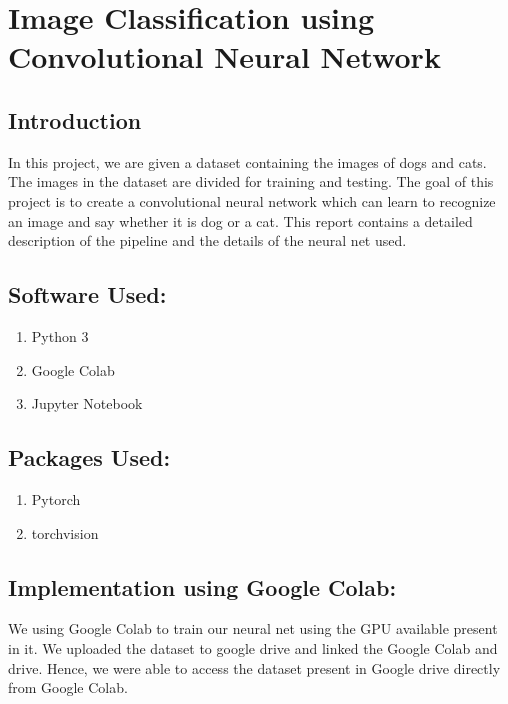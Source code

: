 \documentclass[12pt]{article}
\begin{document}
\section{Image Classification using Convolutional Neural Network} 
\subsection{Introduction}
In this project, we are given a dataset containing the images of dogs and cats. The images in the dataset are divided for training and testing. The goal of this project is to create a convolutional neural network which can learn to recognize an image and say whether it is dog or a cat. This report contains a detailed description of the pipeline and the details of the neural net used. 

\subsection{Software Used:}
\begin{enumerate}
\item Python 3
\item Google Colab
\item Jupyter Notebook
\end{enumerate}

\subsection{Packages Used:}
\begin{enumerate}
\item Pytorch
\item torchvision
\end{enumerate}

\subsection{Implementation using Google Colab:}
We using Google Colab to train our neural net using the GPU available present in it. We uploaded the dataset to google drive and linked the Google Colab and drive. Hence, we were able to access the dataset present in Google drive directly from Google Colab.
\end{document}
